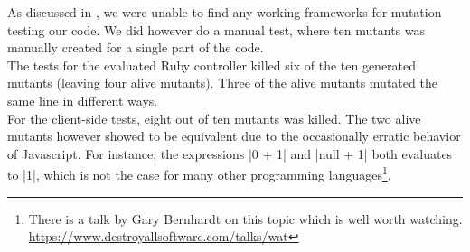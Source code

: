 \MakeShortVerb{\|}

As discussed in , we were unable to find any working
frameworks for mutation testing our code. We did however do a manual
test, where ten mutants was manually created for a single part of the
code.\\

The tests for the evaluated Ruby controller killed six of the ten
generated mutants (leaving four alive mutants). Three of the alive
mutants mutated the same line in different ways.\\

For the client-side tests, eight out of ten mutants was killed. The two
alive mutants however showed to be equivalent due to the occasionally
erratic behavior of Javascript. For instance, the expressions |0 + 1|
and |null + 1| both evaluates to |1|, which is not the case for many
other programming languages\footnote{There is a talk by Gary
Bernhardt on this topic which is well worth watching.
\url{https://www.destroyallsoftware.com/talks/wat}}.\\
